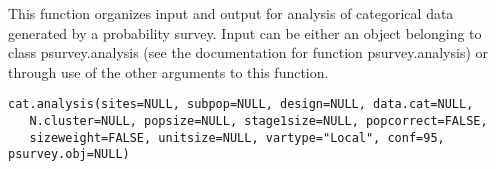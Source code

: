 \begin{Description}\relax
This function organizes input and output for analysis of categorical data 
generated by a probability survey.  Input can be either an object belonging to
class psurvey.analysis (see the documentation for function psurvey.analysis)
or through use of the other arguments to this function.
\end{Description}
\begin{Usage}
\begin{verbatim}
cat.analysis(sites=NULL, subpop=NULL, design=NULL, data.cat=NULL,
   N.cluster=NULL, popsize=NULL, stage1size=NULL, popcorrect=FALSE,
   sizeweight=FALSE, unitsize=NULL, vartype="Local", conf=95, psurvey.obj=NULL)
\end{verbatim}
\end{Usage}
